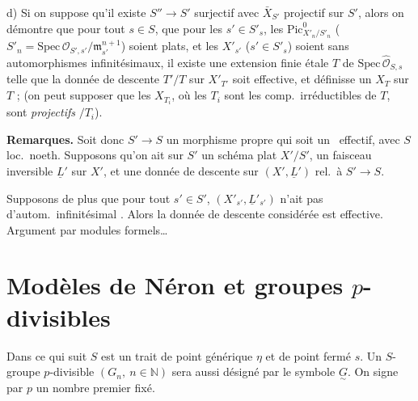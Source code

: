 \documentclass[11pt,a4paper]{article}
\begin{document}
d) Si on suppose  qu'il existe $S'' \to S'$
\struck{\ill{}}  surjectif avec
$\bar{X}_{S'}$ \struck{\ill{}} projectif sur $S'$, alors on démontre que
pour tout $s \in S$, \struck{\ill{}}  que pour les
$s' \in S'_s$, les $\mathrm{Pic}^{0}_{X'_n/S'_n}$
($S'_n = \mathrm{Spec}\, \mathcal{O}_{S',s'}/\mathfrak{m}_{s'}^{n+1}$) soient
plats, et  les $X'_{s'}$ ($s' \in S'_s$) soient sans
automorphismes infinitésimaux, il existe une extension finie étale $T$ de
$\mathrm{Spec}\, \hat{\mathcal{O}}_{S,s}$ telle que la donnée de descente
\struck{\ill{}} $T'/T$ sur $X'_{T'}$ soit effective, et définisse
 un $X_T$ sur $T$ ; (on peut \ill{} supposer que les
 $X_{T_i}$, où les $T_i$ sont les comp.\ irréductibles de $T$,
sont \emph{projectifs} $/T_i$).

\textbf{Remarques.} Soit donc $S' \to S$ un morphisme propre qui soit un
\ effectif, avec $S$ loc.\ noeth. Supposons qu'on ait sur
$S'$ un schéma  plat $X'/S'$, un faisceau inversible
$\underline{L}'$ sur $X'$, et une donnée de descente sur
$(X', \underline{L}')$ rel.\ à $S' \to S$.

 Supposons de plus que pour tout $s' \in S'$,
$(X'_{s'}, \underline{L}'_{s'})$ n'ait pas d'autom.\ infinitésimal
. Alors la donnée de descente considérée est effective.
Argument par modules formels…

\section{Modèles de Néron et groupes $p$-divisibles}

Dans ce qui suit $S$ est un trait de point générique $\eta$ et de point fermé
$s$. Un $S$-groupe $p$-divisible $(G_n,\ n \in \mathbb{N})$ sera aussi
désigné par le symbole $\underset{\sim}{G}$. On signe par $p$ un
nombre premier fixé.
\end{document}
